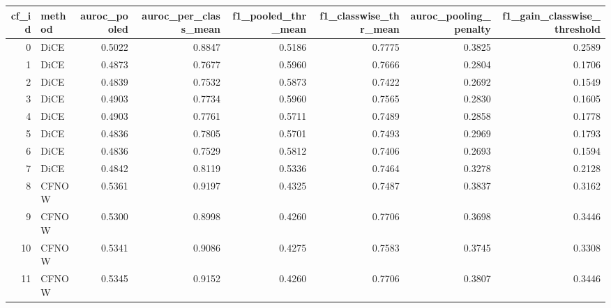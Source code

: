 \begin{tabular}{rlrrrrrr}
\toprule
 cf\_id & method &  auroc\_pooled &  auroc\_per\_class\_mean &  f1\_pooled\_thr\_mean &  f1\_classwise\_thr\_mean &  auroc\_pooling\_penalty &  f1\_gain\_classwise\_threshold \\
\midrule
     0 &   DiCE &        0.5022 &                0.8847 &              0.5186 &                 0.7775 &                 0.3825 &                       0.2589 \\
     1 &   DiCE &        0.4873 &                0.7677 &              0.5960 &                 0.7666 &                 0.2804 &                       0.1706 \\
     2 &   DiCE &        0.4839 &                0.7532 &              0.5873 &                 0.7422 &                 0.2692 &                       0.1549 \\
     3 &   DiCE &        0.4903 &                0.7734 &              0.5960 &                 0.7565 &                 0.2830 &                       0.1605 \\
     4 &   DiCE &        0.4903 &                0.7761 &              0.5711 &                 0.7489 &                 0.2858 &                       0.1778 \\
     5 &   DiCE &        0.4836 &                0.7805 &              0.5701 &                 0.7493 &                 0.2969 &                       0.1793 \\
     6 &   DiCE &        0.4836 &                0.7529 &              0.5812 &                 0.7406 &                 0.2693 &                       0.1594 \\
     7 &   DiCE &        0.4842 &                0.8119 &              0.5336 &                 0.7464 &                 0.3278 &                       0.2128 \\
     8 &  CFNOW &        0.5361 &                0.9197 &              0.4325 &                 0.7487 &                 0.3837 &                       0.3162 \\
     9 &  CFNOW &        0.5300 &                0.8998 &              0.4260 &                 0.7706 &                 0.3698 &                       0.3446 \\
    10 &  CFNOW &        0.5341 &                0.9086 &              0.4275 &                 0.7583 &                 0.3745 &                       0.3308 \\
    11 &  CFNOW &        0.5345 &                0.9152 &              0.4260 &                 0.7706 &                 0.3807 &                       0.3446 \\

\end{tabular}
